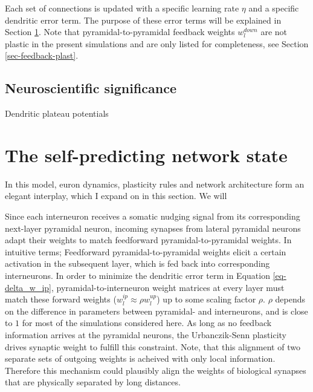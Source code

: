 Each set of connections is updated with a specific learning rate $\eta$ and a specific dendritic error term. The purpose
of these error terms will be explained in Section \ref{sec-selfpred}. Note that pyramidal-to-pyramidal feedback weights
$w_l^{down}$ are not plastic in the present simulations and are only listed for completeness, see Section
\ref{sec-feedback-plast}.


\subsection{Neuroscientific significance}


Dendritic plateau potentials


\section{The self-predicting network state}\label{sec-selfpred}

In this model, euron dynamics, plasticity rules and network architecture form an elegant interplay, which I expand on in
this section. We will

Since each interneuron receives a somatic nudging signal from its corresponding next-layer pyramidal neuron, incoming
synapses from lateral pyramidal neurons adapt their weights to match feedforward pyramidal-to-pyramidal weights. In
intuitive terms; Feedforward pyramidal-to-pyramidal weights elicit a certain activation in the subsequent layer, which
is fed back into corresponding interneurons. In order to minimize the dendritic error term in Equation
\ref{eq-delta_w_ip}, pyramidal-to-interneuron weight matrices at every layer must match these forward weights ($w_l^{ip}
\approx \rho w_l^{up}$) up to some scaling factor $\rho$. $\rho$ depends on the difference in parameters between
pyramidal- and interneurons, and is close to $1$ for most of the simulations considered here. As long as no feedback
information arrives at the pyramidal neurons, the Urbanczik-Senn plasticity drives synaptic weight to fulfill this
constraint. Note, that this alignment of two separate sets of outgoing weights is acheived with only local information.
Therefore this mechanism could plausibly align the weights of biological synapses that are physically separated by long
distances. \newline

